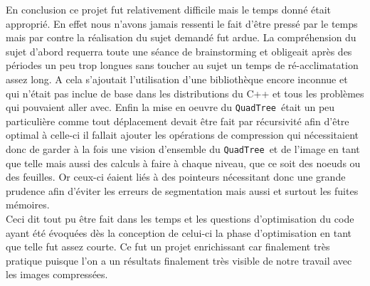 \documentclass{article}
\newcommand{\info}{\texttt}
\newcommand{\qt}{\info{QuadTree}}
\begin{document}
	En conclusion ce projet fut relativement difficile mais le temps donné était approprié. En effet nous n'avons jamais ressenti le fait d'être pressé par le temps mais par contre la réalisation du sujet demandé fut ardue. La compréhension du sujet d'abord requerra toute une séance de brainstorming et obligeait après des périodes un peu trop longues sans toucher au sujet un temps de ré-acclimatation assez long. A cela s'ajoutait l'utilisation d'une bibliothèque encore inconnue et qui n'était pas inclue de base dans les distributions du C++ et tous les problèmes qui pouvaient aller avec. Enfin la mise en oeuvre du \qt\ était un peu particulière comme tout déplacement devait être fait par récursivité afin d'être optimal à celle-ci il fallait ajouter les opérations de compression qui nécessitaient donc de garder à la fois une vision d'ensemble du \qt\ et de l'image en tant que telle mais aussi des calculs à faire à chaque niveau, que ce soit des noeuds ou des feuilles. Or ceux-ci éaient liés à des pointeurs nécessitant donc une grande prudence afin d'éviter les erreurs de segmentation mais aussi et surtout les fuites mémoires.\\
	Ceci dit tout pu être fait dans les temps et les questions d'optimisation du code ayant été évoquées dès la conception de celui-ci la phase d'optimisation en tant que telle fut assez courte. Ce fut un projet enrichissant car finalement très pratique puisque l'on a un résultats finalement très visible de notre travail avec les images compressées.
	
	\newpage
	\tableofcontents
	
\end{document}
